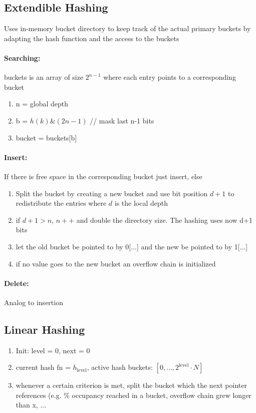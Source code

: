  \subsection{Extendible Hashing}
 Uses in-memory bucket directory to keep track of the actual primary buckets by adapting the hash function and the access to the buckets
 
 
 \paragraph{Searching:} buckets is an array of size $2^{n-1}$ where each entry points to a corresponding bucket
 \begin{enumerate}
     \item n = global depth
     \item b = $h(k) \& (2n-1)$ // mask last n-1 bits
     \item bucket = buckets[b]
 \end{enumerate}
 
 \paragraph{Insert:} If there is free space in the corresponding bucket just insert, else 
 \begin{enumerate}
     \item Split the bucket by creating a new bucket and use bit position $d+1$ to redistribute the entries where $d$ is the local depth
     \item if $d+1 > n$, $n++$ and double the directory size. The hashing uses now d+1 bits
     \item let the old bucket be pointed to by 0[...] and the new be pointed to by 1[...]
     \item if no value goes to the new bucket an overflow chain is initialized
 \end{enumerate}
 
 \paragraph{Delete:} Analog to insertion
 
 \subsection{Linear Hashing}
 \begin{enumerate}
     \item Init: level = 0, next = 0
     \item current hash fn = $h_{\text{level}}$, active hash buckets: $[0,\dots, 2^{\text{level}} \cdot N]$
     \item whenever a certain criterion is met, split the bucket which the next pointer references (e.g. \% occupancy reached in a bucket, overflow chain grew longer than x, $\dots$
 \end{enumerate}
 
